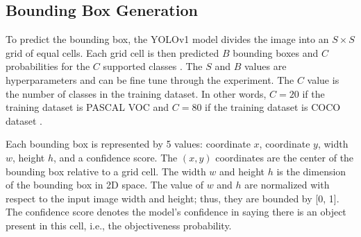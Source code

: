 \subsection{Bounding Box Generation}
To predict the bounding box, the YOLOv1 model divides the image into an $S \times S$ grid of equal cells. Each grid cell is then predicted $B$ bounding boxes and $C$ probabilities for the $C$ supported classes \cite{yolov1_2016}. The $S$ and $B$ values are hyperparameters and can be fine tune through the experiment. The $C$ value is the number of classes in the training dataset. In other words, $C=20$ if the training dataset is PASCAL VOC \cite{pascal_voc_2015} and $C=80$ if the training dataset is COCO dataset \cite{coco_2014}.

Each bounding box is represented by 5 values: coordinate $x$, coordinate $y$, width $w$, height $h$, and a confidence score. The $(x, y)$ coordinates are the center of the bounding box relative to a grid cell. The width $w$ and height $h$  is the dimension of the bounding box in 2D space. The value of $w$ and $h$ are normalized with respect to the input image width and height; thus, they are bounded by [0, 1]. The confidence score denotes the model's confidence in saying there is an object present in this cell, i.e., the objectiveness probability.

\begin{figure}[!ht]
    \centering
    \qquad \qquad
\end{figure}

